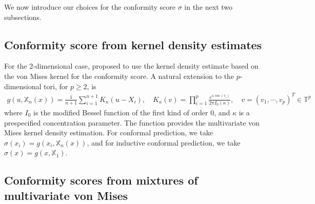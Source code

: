 
We now introduce our choices for the conformity score $\sigma$ in the next two subsections.

\subsection{Conformity score from kernel density estimates}

For the 2-dimensional case, \citet{Jung:2021} proposed to use the kernel density estimate based on the von Mises kernel \citep{Marzio:2011} for the conformity score. A natural extension to the $p$-dimensional tori, for $p\ge 2$, is
\begin{align}\label{eq:6}
    g\left(u, \mathbb{X}_{n}\left(x\right)\right) = \frac{1}{n+1}\sum_{i=1}^{n+1}K_\kappa\left(u-X_i\right),\quad K_\kappa\left(v\right) = \prod_{i=1}^p\frac{e^{\kappa\cos\left(v_i\right)}}{2\pi I_0\left(\kappa\right)},\quad v = \left(v_1,\cdots,v_p\right)^T\in\mathbb{T}^p
\end{align}
where $I_0$ is the modified Bessel function of the first kind of order 0, and $\kappa$ is a prespecified concentration parameter. The function  provides the multivariate von Mises kernel density estimation. For conformal prediction, we take $\sigma\left(x_i\right) = g\left(x_i,\mathbb{X}_n\left(x\right)\right)$, and for inductive conformal prediction, we take $\sigma\left(x\right) = g\left(x,\mathbb{X}_1\right)$. %

\subsection{Conformity scores from mixtures of multivariate von Mises}


